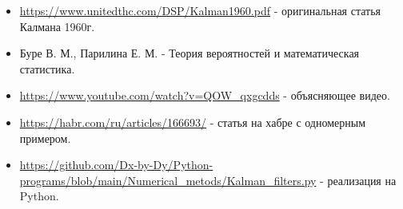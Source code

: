 \documentclass[12pt, a4paper]{article}
\begin{document}
\begin{itemize}
\item \url{https://www.unitedthc.com/DSP/Kalman1960.pdf} - оригинальная статья Калмана 1960г.
\item Буре В. М., Парилина Е. М. - Теория вероятностей и математическая статистика.
\item \url{https://www.youtube.com/watch?v=QOW_qxgcdds} - объясняющее видео.
\item \url{https://habr.com/ru/articles/166693/} - статья на хабре с одномерным примером.
\item \url{https://github.com/Dx-by-Dy/Python-programs/blob/main/Numerical_metods/Kalman_filters.py} - реализация на Python.
\end{itemize}
\end{document}
